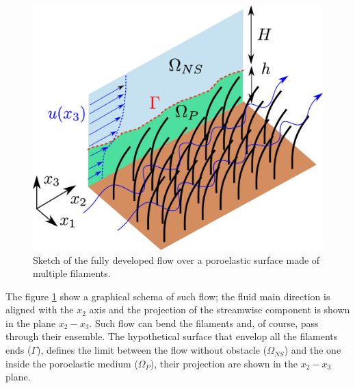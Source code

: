 \begin{figure}[h]
	\centering
	\includegraphics[width=0.7\linewidth]{chapter_1/problem_schema}
	\caption{Sketch of the fully developed flow over a poroelastic surface made of multiple filaments.}
	\label{fig:schema_problem}
\end{figure}

The figure \ref{fig:schema_problem} show a graphical schema of such flow; the fluid main direction is aligned with the $x_2$ axis and the projection of the streamwise component is shown in the plane $x_2 - x_3$.
Such flow can bend the filaments and, of course, pass through their ensemble.
The hypothetical surface that envelop all the filaments ends ($\Gamma$), defines the limit between the flow without obstacle ($\Omega_{NS}$) and the one inside the poroelastic medium ($\Omega_{P}$), their projection are shown in the  $x_2 - x_3$ plane.

